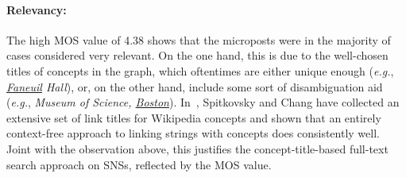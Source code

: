 \documentclass[runningheads,a4paper]{llncs}
\begin{document}
\paragraph{Relevancy:}
The high MOS value of 4.38 shows that the microposts
were in the majority of cases considered very relevant.
On the one hand, this is due to the well-chosen titles of concepts in the graph,
which oftentimes are either unique enough (\emph{e.g.}, \emph{\underline{Faneuil} Hall}),
or, on the other hand, include some sort of disambiguation aid
(\emph{e.g.}, \emph{Museum of Science, \underline{Boston}}).
In~\cite{spitkovsky2012}, Spitkovsky and Chang have collected
an extensive set of link titles for Wikipedia concepts
and shown that an entirely context-free approach
to linking strings with concepts does consistently well.
Joint with the observation above, this justifies
the concept-title-based full-text search approach on SNSs,
reflected by the MOS value.





\end{document}
